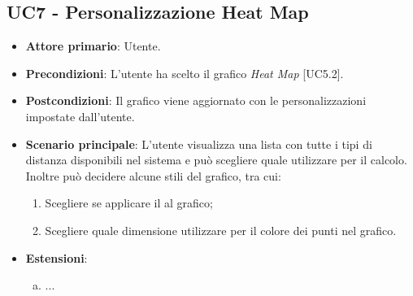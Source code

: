 \subsection{UC7 - Personalizzazione Heat Map}
\begin{itemize}
	\item \textbf{Attore primario}: Utente.
	
	\item \textbf{Precondizioni}: L'utente ha scelto il grafico \textit{Heat Map} [UC5.2].
	
	\item \textbf{Postcondizioni}: Il grafico viene aggiornato con le personalizzazioni impostate dall'utente.
	
	\item \textbf{Scenario principale}: L'utente visualizza una lista con tutte i tipi di distanza disponibili nel sistema e può scegliere quale utilizzare per il calcolo. Inoltre può decidere alcune stili del grafico, tra cui:
		\begin{enumerate}
			\item Scegliere se applicare il  al grafico;
				
			\item Scegliere quale dimensione utilizzare per il colore dei punti nel grafico.
				
		\end{enumerate}
		
		\item \textbf{Estensioni}:
	\begin{enumerate}[(a)]
		\item ...
	\end{enumerate}
\end{itemize}
